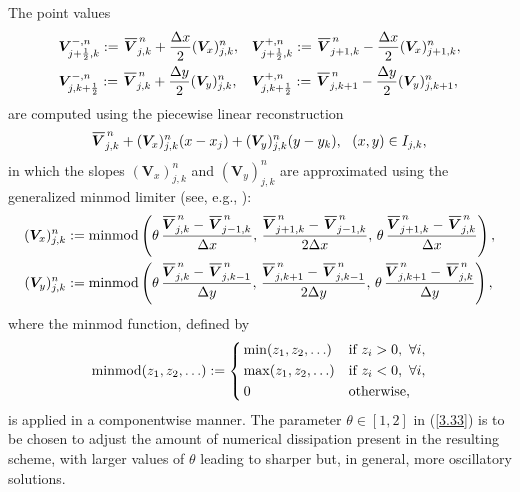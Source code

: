 \documentclass[A4paper,12pt,twoside]{article}
\numberwithin{equation}{section}
\numberwithin{figure}{section}
\numberwithin{table}{section}
\newcommand{\dx}{\Delta x}
\newcommand{\dy}{\Delta y}
\newcommand{\kph}{{k+\frac{1}{2}}}
\newcommand{\jph}{{j+\frac{1}{2}}}
\newcommand{\bV}{\bm{V}}
\newcommand\eref[1]{(\ref{#1})}
\newcommand*\xbar[1]{%
  \hbox{%
    \vbox{%
      \hrule height 0.5pt %
      \kern0.4ex%
      \hbox{%
        \kern-0.05em%
        \ensuremath{#1}%
        \kern-0.00em%
      }%
    }%
  }%
}
\begin{document}
The point values
\begin{equation}
\begin{aligned}
&\bm V^{-,n}_{\jph,k}:=\,\xbar{\bm V}_{j,k}^{\,n}+\frac{\dx}{2}(\bm V_x)_{j,k}^n,&&
\bm V^{+,n}_{\jph,k}:=\,\xbar{\bm V}_{j+1,k}^{\,n}-\frac{\dx}{2}(\bm V_x)_{j+1,k}^n,\\
&\bm V^{-,n}_{j,\kph}:=\,\xbar{\bm V}_{j,k}^{\,n}+\frac{\dy}{2}(\bm V_y)_{j,k}^n,&&
\bm V^{+,n}_{j,\kph}:=\,\xbar{\bm V}_{j,k+1}^{\,n}-\frac{\dy}{2}(\bm V_y)_{j,k+1}^n,
\end{aligned}
\label{3.33f}
\end{equation}
are computed using the piecewise linear reconstruction
$$
\xbar{\bm V}_{j,k}^{\,n}+(\bm V_x)_{j,k}^n(x-x_j)+(\bm V_y)_{j,k}^n(y-y_k),~~(x,y)\in I_{j,k},
$$
in which the slopes $(\bm V_x)_{j,k}^n$ and $(\bm V_y)_{j,k}^n$ are approximated using the generalized minmod limiter (see, e.g.,
\cite{LieNoe,nessyahu1990non,sweby1984high}):
\begin{equation}
\begin{aligned}
(\bV_x)_{j,k}^n&:={\rm minmod}\left(\theta\,\frac{\xbar{\bV}_{j,k}^{\,n}-\,\xbar{\bV}_{j-1,k}^{\,n}}{\dx},\,
\frac{\xbar{\bV}_{j+1,k}^{\,n}-\,\xbar{\bV}_{j-1,k}^{\,n}}{2\dx},\,
\theta\,\frac{\xbar{\bV}_{j+1,k}^{\,n}-\,\xbar{\bV}_{j,k}^{\,n}}{\dx}\right),\\
(\bV_y)_{j,k}^n&:={\rm minmod}\left(\theta\,\frac{\xbar{\bV}_{j,k}^{\,n}-\,\xbar{\bV}_{j,k-1}^{\,n}}{\dy},\,
\frac{\xbar{\bV}_{j,k+1}^{\,n}-\,\xbar{\bV}_{j,k-1}^{\,n}}{2\dy},\,
\theta\,\frac{\xbar{\bV}_{j,k+1}^{\,n}-\,\xbar{\bV}_{j,k}^{\,n}}{\dy}\right),
\end{aligned}
\label{3.33}
\end{equation}
where the minmod function, defined by
\begin{equation*}
{\rm minmod}(z_1,z_2,\ldots):=\left\{\begin{aligned}
&\min(z_1,z_2,\ldots)&&\mbox{if}~z_i>0,~\forall i,\\
&\max(z_1,z_2,\ldots)&&\mbox{if}~z_i<0,~\forall i,\\
&\,0&&\mbox{otherwise},
\end{aligned}\right.
\end{equation*}
is applied in a componentwise manner. The parameter $\theta\in[1,2]$ in \eref{3.33} is to be chosen to adjust the amount of numerical
dissipation present in the resulting scheme, with larger values of $\theta$ leading to sharper but, in general, more oscillatory solutions.
\end{document}
